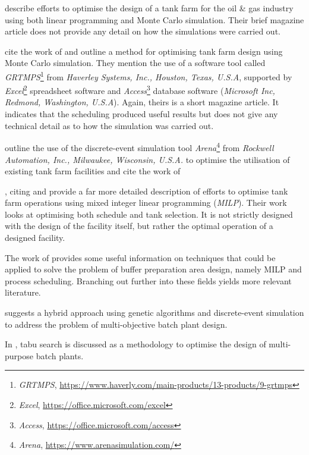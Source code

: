 \citet{Al-Otaibi:2004} describe efforts to optimise the design of a tank farm
for the oil \& gas industry using both linear programming and Monte Carlo
simulation.  Their brief magazine article does not provide any detail on
how the simulations were carried out.

\citet{Stewart:2005} cite the work of \citet{Al-Otaibi:2004} and outline a
method for optimising tank farm design using Monte Carlo simulation.  They
mention the use of a software tool called \emph{GRTMPS}\footnote{
    \emph{GRTMPS},
    \url{https://www.haverly.com/main-products/13-products/9-grtmps}} from 
\emph{Haverley Systems, Inc., Houston, Texas, U.S.A}, supported by
\emph{Excel}\footnote{\emph{Excel}, \url{https://office.microsoft.com/excel}}
spreadsheet software and 
\emph{Access}\footnote{\emph{Access}, 
    \url{https://office.microsoft.com/access}}
database software
(\emph{Microsoft Inc, Redmond, Washington, U.S.A}).
Again, theirs is a short magazine article.  It indicates that the scheduling 
produced useful results but does not give any technical detail as to how the
simulation was carried out.

\citet{Sharda:2009} outline the use of the discrete-event simulation tool
\emph{Arena\textsuperscript{\textregistered}}\footnote{
    \emph{Arena}, \url{https://www.arenasimulation.com/}} from
\emph{Rockwell Automation, Inc., Milwaukee, Wisconsin, U.S.A.} to optimise the 
utilisation of existing tank farm facilities and cite the work of
\citet{Sharda:2009}

\citet{Terrazas-Moreno:2012}, citing \citet{Stewart:2005} and 
\citet{Sharda:2009} provide a far more detailed description of efforts to
optimise tank farm operations using mixed integer linear programming 
(\emph{MILP}).
Their work looks at optimising both schedule and tank selection.
It is not strictly designed with the design of the facility itself, but rather
the optimal operation of a designed facility.

The work of \citet{Terrazas-Moreno:2012} provides some useful information on
techniques that could be applied to solve the problem of buffer preparation
area design, namely MILP and process scheduling.  Branching out further into
these fields yields more relevant literature.

\citet{Dedieu:2003} suggests a hybrid approach using genetic
algorithms and discrete-event simulation to address the problem of 
multi-objective batch plant design.

In \citet{Cavin:2004, Cavin:2005}, tabu search is discussed as a methodology to
optimise the design of multi-purpose batch plants.

